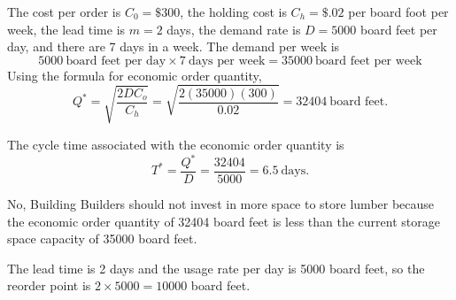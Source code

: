 \begin{enumerate}
\begin{solution}
  \bs The cost per order is $C_0=\$300$, the holding cost is
  $C_h=\$.02$ per board foot per week, the lead time is $m=2$ days,
  the demand rate is $D=\num{5000}$ board feet per day, and there are
  7 days in a week.  The demand per week is
  \[\num{5000} ~\text{board feet per day} \times 7 ~\text{days per
      week} = \num{35000} ~\text{board feet per week}\] Using the
  formula for economic order quantity,
\[ Q^{\ast} = \sqrt{\frac{2DC_o}{C_h}} = \sqrt{\frac{2(\num{35000})(300)}{0.02}} = \num{32404}~\text{board feet.} \]

The cycle time associated with the economic order quantity is
\[ T^{\ast} = \frac{Q^{\ast}}{D} = \frac{\num{32404}}{\num{5000}} = 6.5 ~\text{days.} \]

No, Building Builders should not invest in more space to store lumber
because the economic order quantity of \num{32404} board feet is less
than the current storage space capacity of \num{35000} board feet.

The lead time is 2 days and the usage rate per day is \num{5000} board
feet, so the reorder point is $2 \times \num{5000} = \num{10000}$
board feet.
\end{solution}


\end{enumerate}
